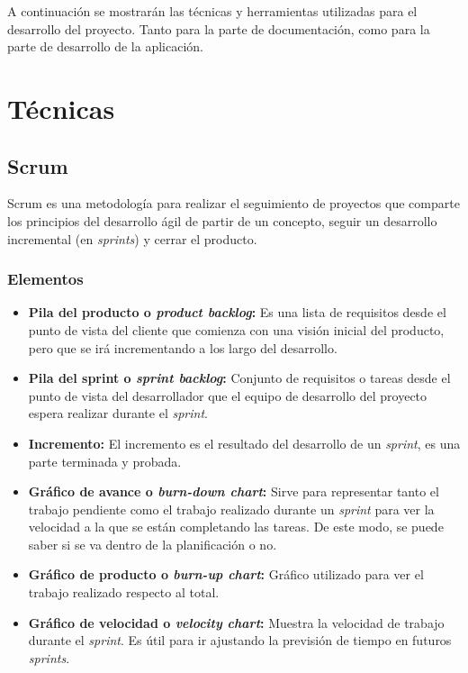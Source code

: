 
A continuación se mostrarán las técnicas y herramientas utilizadas para el desarrollo del proyecto. 
Tanto para la parte de documentación, como para la parte de desarrollo de la aplicación. 

\section{Técnicas}
\subsection{Scrum}
Scrum es una metodología para realizar el seguimiento de proyectos que comparte los principios del desarrollo ágil de partir de un concepto, seguir un desarrollo incremental (en \textit{sprints}) y cerrar el producto.~\cite{scrum}

\subsubsection{Elementos}
\begin{itemize}
\item \textbf{Pila del producto o \textit{product backlog}:}
Es una lista de requisitos desde el punto de vista del cliente que comienza con una visión inicial del producto, pero que se irá incrementando a los largo del desarrollo.

\item \textbf{Pila del sprint o \textit{sprint backlog}:}
Conjunto de requisitos o tareas desde el punto de vista del desarrollador que el equipo de desarrollo del proyecto espera realizar durante el \textit{sprint}.

\item \textbf{Incremento:}
El incremento es el resultado del desarrollo de un \textit{sprint}, es una parte terminada y probada. 

\item \textbf{Gráfico de avance o \textit{burn-down chart}:}
Sirve para representar tanto el trabajo pendiente como el trabajo realizado durante un \textit{sprint} para ver la velocidad a la que se están completando las tareas. De este modo, se puede saber si se va dentro de la planificación o no.

\item \textbf{Gráfico de producto o \textit{burn-up chart}:}
Gráfico utilizado para ver el trabajo realizado respecto al total.

\item \textbf{Gráfico de velocidad o \textit{velocity chart}:}
Muestra la velocidad de trabajo durante el \textit{sprint}. Es útil para ir ajustando la previsión de tiempo en futuros \textit{sprints}.
\end{itemize}

